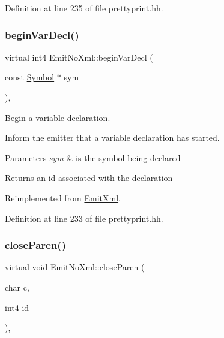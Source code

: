 Definition at line 235 of file prettyprint.\+hh.

\mbox{\label{class_emit_no_xml_a5d3a356f62dc06efc46b35fc969323ae}} 
\subsubsection{\texorpdfstring{beginVarDecl()}{beginVarDecl()}}
{\footnotesize\ttfamily virtual int4 Emit\+No\+Xml\+::begin\+Var\+Decl (\begin{DoxyParamCaption}\item[{const \mbox{\hyperlink{class_symbol}{Symbol}} $\ast$}]{sym }\end{DoxyParamCaption})\hspace{0.3cm}{\ttfamily [inline]}, {\ttfamily [virtual]}}



Begin a variable declaration. 

Inform the emitter that a variable declaration has started. 
\begin{DoxyParams}{Parameters}
{\em sym} & is the symbol being declared \\
\hline
\end{DoxyParams}
\begin{DoxyReturn}{Returns}
an id associated with the declaration 
\end{DoxyReturn}


Reimplemented from \mbox{\hyperlink{class_emit_xml_a039212bc4a27cf56f1c70acd4d4623b6}{Emit\+Xml}}.



Definition at line 233 of file prettyprint.\+hh.

\mbox{\label{class_emit_no_xml_a7554f4a6b9b246c34a3c4febd99c740c}} 
\subsubsection{\texorpdfstring{closeParen()}{closeParen()}}
{\footnotesize\ttfamily virtual void Emit\+No\+Xml\+::close\+Paren (\begin{DoxyParamCaption}\item[{char}]{c,  }\item[{int4}]{id }\end{DoxyParamCaption})\hspace{0.3cm}{\ttfamily [inline]}, {\ttfamily [virtual]}}



